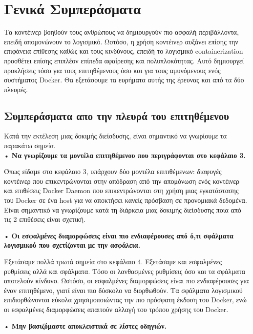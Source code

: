 \chapter{Γενικά Συμπεράσματα}
\label{conclusions}

Τα κοντέινερ βοηθούν τους ανθρώπους να δημιουργούν πιο ασφαλή περιβάλλοντα,
επειδή απομονώνουν το λογισμικό. Ωστόσο, η χρήση κοντέινερ αυξάνει επίσης την
επιφάνεια επίθεσης καθώς και τους κινδύνους, επειδή το λογισμικό
\textlatin{containerization} προσθέτει επίσης επιπλέον επίπεδα αφαίρεσης και
πολυπλοκότητας. Αυτό δημιουργεί προκλήσεις τόσο για τους επιτηθέμενους όσο και
για τους αμυνόμενους ενός συστήματος \textlatin{Docker}. Θα εξετάσουμε τα
ευρήματα αυτής της έρευνας και από τα δύο πλευρές.

\section{Συμπεράσματα απο την πλευρά του επιτηθέμενου}

Κατά την εκτέλεση μιας δοκιμής διείσδυσης, είναι σημαντικό να γνωρίουμε τα
παρακάτω σημεία. \\

• \textbf{Να γνωρίζουμε τα μοντέλα επιτηθέμενου που περιγράφονται στο κεφάλαιο
3.}

Όπως είδαμε στο κεφάλαιο 3, υπάρχουν δύο μοντέλα επιτιθέμενων: διαφυγές
κοντέινερ που επικεντρώνονται στην απόδραση από την απομόνωση ενός κοντέινερ και
επιθέσεις \textlatin{Docker Daemon} που επικεντρώνονται στη χρήση μιας
εγκατάστασης του \textlatin{Docker} σε ένα \textlatin{host} για να αποκτήσει
κανείς πρόσβαση σε προνομιακά δεδομένα. Είναι σημαντικό να γνωρίζουμε κατά τη
διάρκεια μιας δοκιμής διείσδυσης ποια από τις 2 επιθέσεις είναι σχετική.

• \textbf{Οι εσφαλμένες διαμορφώσεις είναι πιο ενδιαφέρουσες από ό,τι
σφάλματα λογισμικού που σχετίζονται με την ασφάλεια.}

Εξετάσαμε πολλά τρωτά σημεία στο κεφάλαιο 4. Εξετάσαμε και εσφαλμένες ρυθμίσεις
αλλά και σφάλματα. Τόσο οι λανθασμένες ρυθμίσεις όσο και τα σφάλματα
αποτελούν κίνδυνο. Ωστόσο, οι εσφαλμένες διαμορφώσεις είναι πιο ενδιαφέρουσες
για έναν επιτηθέμενο, γιατί είναι πιο δύσκολο να διορθωθούν. Τα σφάλματα
λογισμικού επιδιορθώνονται εύκολα χρησιμοποιώντας την πιο πρόσφατη έκδοση του
\textlatin{Docker}, ενώ οι εσφαλμένες διαμορφώσεις απαιτούν αλλαγή του τρόπου
χρήσης του \textlatin{Docker}.

• \textbf{Μην βασιζόμαστε αποκλειστικά σε λίστες οδηγιών.}

